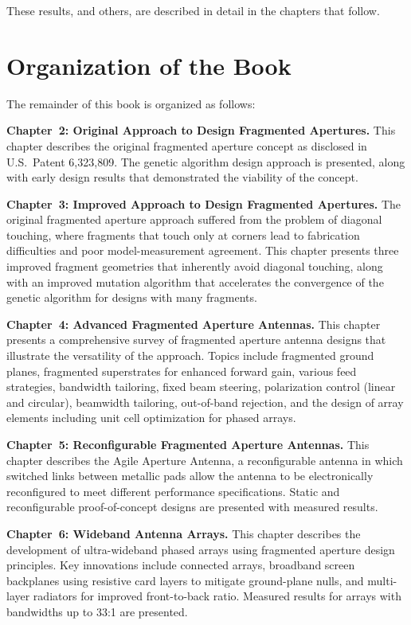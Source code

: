 These results, and others, are described in detail in the chapters that follow.

\section{Organization of the Book}

The remainder of this book is organized as follows:

\textbf{Chapter~2: Original Approach to Design Fragmented Apertures.}  This chapter describes the original fragmented aperture concept as disclosed in U.S.\ Patent 6,323,809.  The genetic algorithm design approach is presented, along with early design results that demonstrated the viability of the concept.

\textbf{Chapter~3: Improved Approach to Design Fragmented Apertures.}  The original fragmented aperture approach suffered from the problem of diagonal touching, where fragments that touch only at corners lead to fabrication difficulties and poor model-measurement agreement.  This chapter presents three improved fragment geometries that inherently avoid diagonal touching, along with an improved mutation algorithm that accelerates the convergence of the genetic algorithm for designs with many fragments.

\textbf{Chapter~4: Advanced Fragmented Aperture Antennas.}  This chapter presents a comprehensive survey of fragmented aperture antenna designs that illustrate the versatility of the approach.  Topics include fragmented ground planes, fragmented superstrates for enhanced forward gain, various feed strategies, bandwidth tailoring, fixed beam steering, polarization control (linear and circular), beamwidth tailoring, out-of-band rejection, and the design of array elements including unit cell optimization for phased arrays.

\textbf{Chapter~5: Reconfigurable Fragmented Aperture Antennas.}  This chapter describes the Agile Aperture Antenna, a reconfigurable antenna in which switched links between metallic pads allow the antenna to be electronically reconfigured to meet different performance specifications.  Static and reconfigurable proof-of-concept designs are presented with measured results.

\textbf{Chapter~6: Wideband Antenna Arrays.}  This chapter describes the development of ultra-wideband phased arrays using fragmented aperture design principles.  Key innovations include connected arrays, broadband screen backplanes using resistive card layers to mitigate ground-plane nulls, and multi-layer radiators for improved front-to-back ratio.  Measured results for arrays with bandwidths up to 33:1 are presented.

